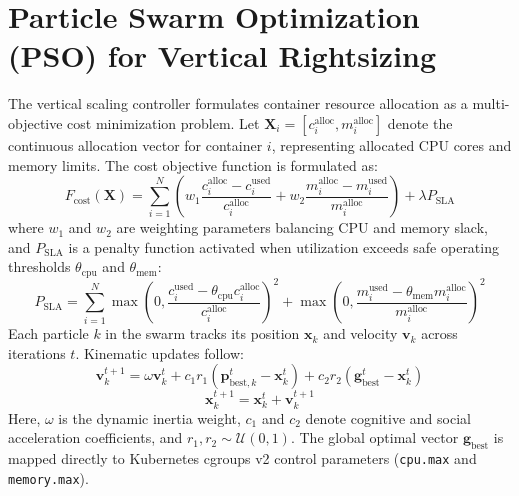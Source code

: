 \documentclass[12pt,a4paper]{report}
\begin{document}
\section{Particle Swarm Optimization (PSO) for Vertical Rightsizing}
The vertical scaling controller formulates container resource allocation as a multi-objective cost minimization problem. Let $\mathbf{X}_i = [c_i^{\text{alloc}}, m_i^{\text{alloc}}]$ denote the continuous allocation vector for container $i$, representing allocated CPU cores and memory limits. The cost objective function is formulated as:
\begin{equation}
    F_{\text{cost}}(\mathbf{X}) = \sum_{i=1}^N \left( w_1 \frac{c_i^{\text{alloc}} - c_i^{\text{used}}}{c_i^{\text{alloc}}} + w_2 \frac{m_i^{\text{alloc}} - m_i^{\text{used}}}{m_i^{\text{alloc}}} \right) + \lambda P_{\text{SLA}}
\end{equation}
where $w_1$ and $w_2$ are weighting parameters balancing CPU and memory slack, and $P_{\text{SLA}}$ is a penalty function activated when utilization exceeds safe operating thresholds $\theta_{\text{cpu}}$ and $\theta_{\text{mem}}$:
\begin{equation}
    P_{\text{SLA}} = \sum_{i=1}^N \max\left(0, \frac{c_i^{\text{used}} - \theta_{\text{cpu}} c_i^{\text{alloc}}}{c_i^{\text{alloc}}}\right)^2 + \max\left(0, \frac{m_i^{\text{used}} - \theta_{\text{mem}} m_i^{\text{alloc}}}{m_i^{\text{alloc}}}\right)^2
\end{equation}
Each particle $k$ in the swarm tracks its position $\mathbf{x}_k$ and velocity $\mathbf{v}_k$ across iterations $t$. Kinematic updates follow:
\begin{equation}
    \mathbf{v}_k^{t+1} = \omega \mathbf{v}_k^t + c_1 r_1 (\mathbf{p}_{\text{best},k}^t - \mathbf{x}_k^t) + c_2 r_2 (\mathbf{g}_{\text{best}}^t - \mathbf{x}_k^t)
\end{equation}
\begin{equation}
    \mathbf{x}_k^{t+1} = \mathbf{x}_k^t + \mathbf{v}_k^{t+1}
\end{equation}
Here, $\omega$ is the dynamic inertia weight, $c_1$ and $c_2$ denote cognitive and social acceleration coefficients, and $r_1, r_2 \sim \mathcal{U}(0,1)$. The global optimal vector $\mathbf{g}_{\text{best}}$ is mapped directly to Kubernetes cgroups v2 control parameters (\texttt{cpu.max} and \texttt{memory.max}).
\end{document}
